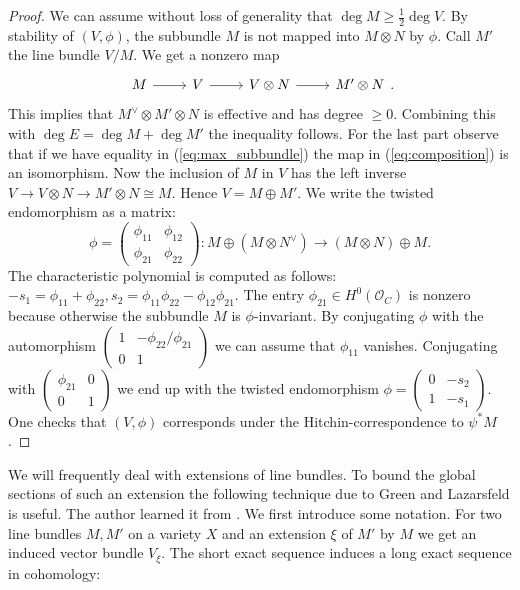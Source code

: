 \documentclass[12pt]{extarticle}
\theoremstyle{definition}
\numberwithin{theorem}{section}
\newcommand{\OO}{\mathcal{O}}
\begin{document}
\begin{proof}
We can assume without loss of generality that $\deg M \geq \frac{1}{2}\deg V$. By stability of $(V,\phi)$, the subbundle $M$ is not mapped into $M \otimes N$ by $\phi$. Call $M'$ the line bundle $V/M$. We get a nonzero map
\begin{equation}\label{eq:composition}
\begin{tikzcd}[ampersand replacement=\&]
	M \& V \& {V\otimes N} \& {M'\otimes N}
	\arrow[from=1-1, to=1-2]
	\arrow[from=1-2, to=1-3]
	\arrow[from=1-3, to=1-4]
\end{tikzcd}.
\end{equation}
This implies that $M^\vee \otimes M' \otimes N$ is effective and has degree $\geq 0$. Combining this with $\deg E = \deg M + \deg M'$ the inequality follows. 
For the last part observe that if we have equality in (\ref{eq:max_subbundle}) the map in (\ref{eq:composition}) is an isomorphism. Now the inclusion of $M$ in $V$ has the left inverse $V \rightarrow V \otimes N \rightarrow M' \otimes N \cong M$. Hence $V = M \oplus M'$. We write the twisted endomorphism as a matrix:
\begin{equation}
\phi = \begin{pmatrix}
\phi_{11} & \phi_{12} \\
\phi_{21} & \phi_{22}
\end{pmatrix} : M \oplus (M \otimes N^\vee) \rightarrow (M \otimes N) \oplus M.
\end{equation}
The characteristic polynomial is computed as follows: $-s_1 = \phi_{11} + \phi_{22}, s_2 = \phi_{11}\phi_{22} - \phi_{12}\phi_{21}$. The entry $\phi_{21} \in H^0(\OO_C)$ is nonzero because otherwise the subbundle $M$ is $\phi$-invariant. By conjugating $\phi$ with the automorphism $\begin{pmatrix}
1 & -\phi_{22}/\phi_{21} \\
0 & 1
\end{pmatrix}$ we can assume that $\phi_{11}$ vanishes. Conjugating with $\begin{pmatrix}
\phi_{21} & 0 \\
0 & 1
\end{pmatrix}$ we end up with the twisted endomorphism $\phi = \begin{pmatrix}
0 & -s_2 \\
1 & -s_1
\end{pmatrix}$. One checks that $(V,\phi)$ corresponds under the Hitchin-correspondence to $\psi^*M$.
\end{proof}
We will frequently deal with extensions of line bundles. To bound the global sections of such an extension the following technique due to Green and Lazarsfeld is useful. The author learned it from \cite[Section 3]{Lazarsfeld}. We first introduce some notation. For two line bundles $M,M'$ on a variety $X$ and an extension $\xi$ of $M'$ by $M$ we get an induced vector bundle $V_\xi$. The short exact sequence induces a long exact sequence in cohomology:
\end{document}
